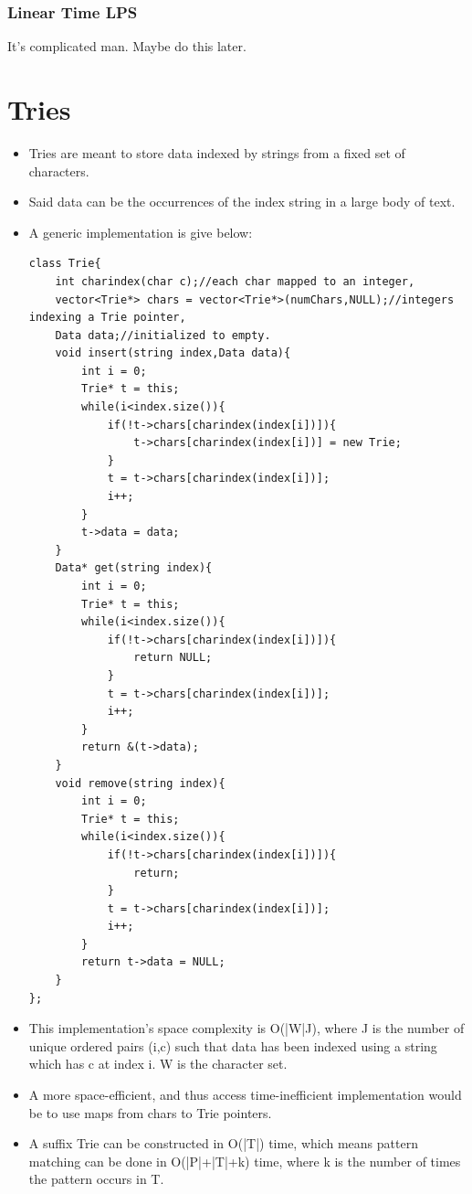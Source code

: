 \documentclass{report}
\begin{document}
\subsubsection{Linear Time LPS}
It's complicated man. Maybe do this later.
\section{Tries}
\begin{itemize}
\item Tries are meant to store data indexed by strings from a fixed set of characters.
\item Said data can be the occurrences of the index string in a large body of text.
\item A generic implementation is give below:
\begin{lstlisting}
class Trie{
    int charindex(char c);//each char mapped to an integer,
    vector<Trie*> chars = vector<Trie*>(numChars,NULL);//integers indexing a Trie pointer,
    Data data;//initialized to empty.
    void insert(string index,Data data){
        int i = 0;
        Trie* t = this;
        while(i<index.size()){
            if(!t->chars[charindex(index[i])]){
                t->chars[charindex(index[i])] = new Trie;
            }
            t = t->chars[charindex(index[i])];
            i++;
        }
        t->data = data;
    }
    Data* get(string index){
        int i = 0;
        Trie* t = this;
        while(i<index.size()){
            if(!t->chars[charindex(index[i])]){
                return NULL;
            }
            t = t->chars[charindex(index[i])];
            i++;
        }
        return &(t->data);
    }
    void remove(string index){
        int i = 0;
        Trie* t = this;
        while(i<index.size()){
            if(!t->chars[charindex(index[i])]){
                return;
            }
            t = t->chars[charindex(index[i])];
            i++;
        }
        return t->data = NULL;
    }
};
\end{lstlisting}
\item This implementation's space complexity is O(|W|J), where J is the number of unique
ordered pairs (i,c) such that data has been indexed using a string which has c at index i.
W is the character set.
\item A more space-efficient, and thus access time-inefficient implementation would be
to use maps from chars to Trie pointers.
\item A suffix Trie can be constructed in O(|T|) time, which means pattern matching can be done
in O(|P|+|T|+k) time, where k is the number of times the pattern occurs in T.  
\end{itemize}
\end{document}
